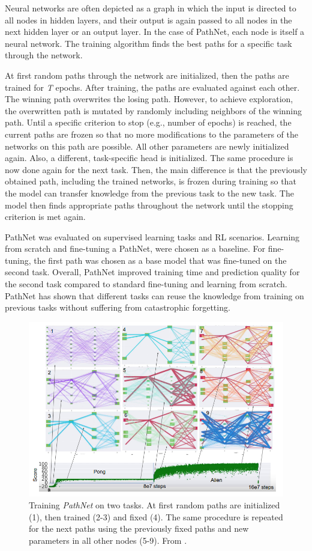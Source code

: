 \documentclass[
]{krantz}
\begin{document}
Neural networks are often depicted as a graph in which the input is directed to all nodes in hidden layers, and their output is again passed to all nodes in the next hidden layer or an output layer.
In the case of PathNet, each node is itself a neural network. The training algorithm finds the best paths for a specific task through the network.

At first random paths through the network are initialized, then the paths are trained for \emph{T} epochs. After training, the paths are evaluated against each other. The winning path overwrites
the losing path. However, to achieve exploration, the overwritten path is mutated by randomly including neighbors of the winning path. Until a specific criterion to stop
(e.g., number of epochs) is reached, the current paths are frozen so that no more modifications to the parameters of the networks on this path are possible. All other parameters
are newly initialized again. Also, a different, task-specific head is initialized. The same procedure is now done again for the next task. Then, the main difference is that the previously obtained path,
including the trained networks, is frozen during training so that the model can transfer knowledge from the previous task to the new task. The model then finds appropriate paths throughout the
network until the stopping criterion is met again.

PathNet was evaluated on supervised learning tasks and RL scenarios. Learning from scratch and fine-tuning a PathNet, were chosen as a baseline. For fine-tuning, the first path was chosen as a
base model that was fine-tuned on the second task. Overall, PathNet improved training time and prediction quality for the second task compared to standard fine-tuning and learning from scratch.
PathNet has shown that different tasks can reuse the knowledge from training on previous tasks without suffering from catastrophic forgetting.

\begin{figure}

{\centering \includegraphics[width=0.8\linewidth]{figures/03-03-multipurpose/PathNet} 

}

\caption{Training \emph{PathNet} on two tasks. At first random paths are initialized (1), then trained (2-3) and fixed (4). The same procedure is repeated for the next paths using the previously
fixed paths and new parameters in all other nodes (5-9). From \citet{Fernando2017}.}\label{fig:pathnet}
\end{figure}
\end{document}
